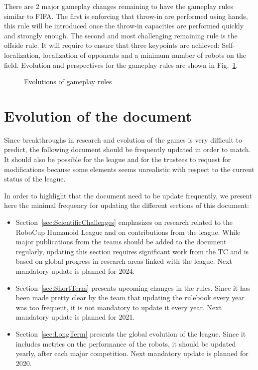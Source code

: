 \documentclass{article}
\begin{document}
There are 2 major gameplay changes remaining to have the gameplay rules similar to FIFA.
The first is enforcing that throw-in are performed using hands,
this rule will be introduced once the throw-in capacities are performed quickly and
strongly enough.
The second and most challenging remaining rule is the offside rule.
It will require to ensure that three keypoints are achieved:
Self-localization, localization of opponents and a minimum number of robots on the field.
Evolution and perspectives for the gameplay rules are shown in Fig.~\ref{fig:gameplay_rules}.

\begin{figure}
  \centering
  
  \caption{\label{fig:gameplay_rules}Evolutions of gameplay rules}
\end{figure}


\section{Evolution of the document}

Since breakthroughs in research and evolution of the games is very difficult to predict,
the following document should be frequently updated in order to match.
It should also be possible for the league and for the trustees to request for
modifications because some elements seems unrealistic with respect to the current
status of the league.

In order to highlight that the document need to be update frequently, we present
here the minimal frequency for updating the different sections of this document:
\begin{itemize}
\item Section~\ref{sec:ScientificChallenges} emphasizes on research related to
  the RoboCup Humanoid League and on contributions from the league.
  While major publications from the teams should be added to the document regularly,
  updating this section requires significant work from the TC and is based on
  global progress in research areas linked with the league.
  Next mandatory update is planned for 2024.
\item Section~\ref{sec:ShortTerm} presents upcoming changes in the rules.
  Since it has been made pretty clear by the team that updating the rulebook
  every year was too frequent,
  it is not mandatory to update it every year.
  Next mandatory update is planned for 2021.
\item Section~\ref{sec:LongTerm} presents the global evolution of the league.
  Since it includes metrics on the performance of the robots,
  it should be updated yearly, after each major competition.
  Next mandatory update is planned for 2020.
\end{itemize}

\newpage

\printbibliography
\end{document}
